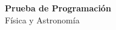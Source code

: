 \documentclass[10pt]{article}
\begin{document}
\begin{center}
  {\huge\bfseries\textcolor{unabblue}{Prueba de Programación}}\\[4pt]
  {\Large\sffamily\textcolor{unabgold}{Física y Astronomía}}\\[6pt]
\end{center}




\noindent\makebox[\linewidth]{\rule{\textwidth}{0.4pt}}

\end{document}
